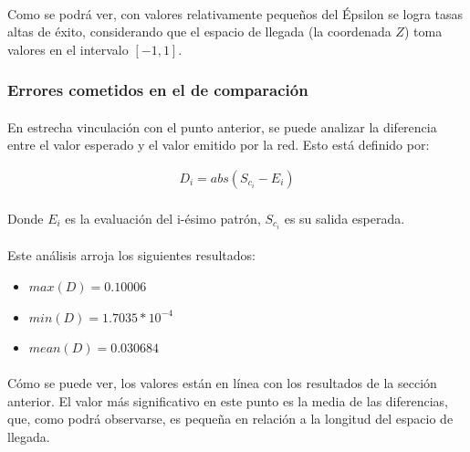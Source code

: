 \documentclass[12pt, twocolumn]{article}
\begin{document}
	\paragraph{} Como se podrá ver, con valores relativamente pequeños del Épsilon se logra tasas altas de éxito, considerando que el espacio de llegada (la coordenada $Z$) toma valores en el intervalo $\left[-1, 1\right]$.
	
	\subsubsection{Errores cometidos en el  de comparación}
	
	\paragraph{} En estrecha vinculación con el punto anterior, se puede analizar la diferencia entre el valor esperado y el valor emitido por la red. Esto está definido por:
	
	\begin{align}
		D_{i} = abs(S_{c_{i}}-E_{i})
	\end{align}
	
	\paragraph{} Donde $E_{i}$ es la evaluación del i-ésimo patrón, $S_{c_{i}}$ es su salida esperada.
	
	\paragraph{} Este análisis arroja los siguientes resultados:
	
	\begin{itemize}
		\item $max(D) = 0.10006$
		\item $min(D) = 1.7035*10^{-4}$
		\item $mean(D) = 0.030684$
	\end{itemize}
	
	\paragraph{} Cómo se puede ver, los valores están en línea con los resultados de la sección anterior. El valor más significativo en este punto es la media de las diferencias, que, como podrá observarse, es pequeña en relación a la longitud del espacio de llegada. 
	
\end{document}

